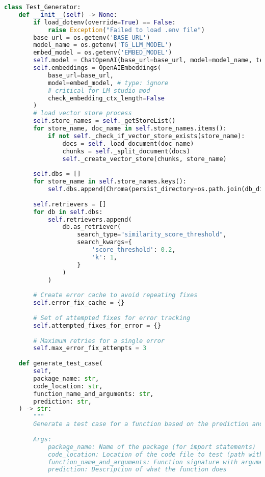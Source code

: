 \begin{lstlisting}[language=Python, caption={$\texttt{Test\_Generator}$ class.}, label={lst:14}]
    class Test_Generator:
    def __init__(self) -> None:
        if load_dotenv(override=True) == False:
            raise Exception("Failed to load .env file")
        base_url = os.getenv('BASE_URL')
        model_name = os.getenv('TG_LLM_MODEL')
        embed_model = os.getenv('EMBED_MODEL')
        self.model = ChatOpenAI(base_url=base_url, model=model_name, temperature=0) # type: ignore
        self.embeddings = OpenAIEmbeddings(
            base_url=base_url, 
            model=embed_model, # type: ignore
            # critical for LM studio mod
            check_embedding_ctx_length=False
        )
        # load vector store process
        self.store_names = self._getStoreList()
        for store_name, doc_name in self.store_names.items():
            if not self._check_if_vector_store_exists(store_name):
                docs = self._load_document(doc_name)
                chunks = self._split_document(docs)
                self._create_vector_store(chunks, store_name)
        
        self.dbs = []
        for store_name in self.store_names.keys():
            self.dbs.append(Chroma(persist_directory=os.path.join(db_dir, store_name), embedding_function=self.embeddings))
        
        self.retrievers = []
        for db in self.dbs:
            self.retrievers.append(
                db.as_retriever(
                    search_type="similarity_score_threshold",
                    search_kwargs={
                        'score_threshold': 0.2,
                        'k': 1,
                    }
                )
            )
        
        # Create error cache to avoid repeating fixes
        self.error_fix_cache = {}
        
        # Set of attempted fixes for error tracking
        self.attempted_fixes_for_error = {}
        
        # Maximum retries for a single error
        self.max_error_fix_attempts = 3
        
    def generate_test_case(
        self,
        package_name: str,
        code_location: str,
        function_name_and_arguments: str,
        prediction: str,
    ) -> str:
        """
        Generate a test case for a function based on the prediction and code details.
        
        Args:
            package_name: Name of the package (for import statements)
            code_location: Location of the code file to test (path within the package)
            function_name_and_arguments: Function signature with arguments
            prediction: Description of what the function does
            

\end{lstlisting}
